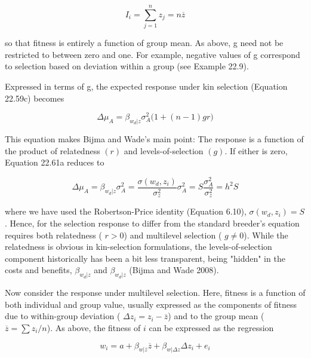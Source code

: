 \documentclass{article}
\begin{document}
\begin{equation}
I_{i}=\sum_{j=1}^{n}z_{j}=n\overline{z}
\end{equation}

so that fitness is entirely a function of group mean. As above, g need not be restricted to between zero and one. For example, negative values of g correspond to selection based on deviation within a group (see Example 22.9).

Expressed in terms of g, the expected response under kin selection (Equation 22.59c) becomes

\begin{equation}
\Delta\mu_{A}=\beta_{w_{d}|z}\sigma_{A}^{2}\bigg(1+(n-1)g r\bigg)
\tag{22.61a}
\label{eq:22_61a}
\end{equation}

This equation makes Bijma and Wade's main point: The response is a function of the product of relatedness  $ (r) $ and levels-of-selection  $ (g) $. If either is zero, Equation 22.61a reduces to

\begin{equation}
\Delta\mu_{A}=\beta_{w_{d}|z}\sigma_{A}^{2}=\frac{\sigma(w_{d},z_{i})}{\sigma_{z}^{2}}\sigma_{A}^{2}=S\frac{\sigma_{A}^{2}}{\sigma_{z}^{2}}=h^{2}S
\tag{22.61b}
\label{eq:22_61b}
\end{equation}

where we have used the Robertson-Price identity (Equation 6.10),  $ \sigma(w_d, z_i) = S $. Hence, for the selection response to differ from the standard breeder's equation requires both relatedness ( $ r > 0 $) and multilevel selection ( $ g \neq 0 $). While the relatedness is obvious in kin-selection formulations, the levels-of-selection component historically has been a bit less transparent, being "hidden" in the costs and benefits,  $ \beta_{w_d | z} $ and  $ \beta_{w_d | z} $ (Bijma and Wade 2008).

Now consider the response under multilevel selection. Here, fitness is a function of both individual and group value, usually expressed as the components of fitness due to within-group deviation ( $ \Delta z_i = z_i - \overline{z} $) and to the group mean ( $ \overline{z} = \sum z_i/n $). As above, the fitness of  $ i $ can be expressed as the regression

\begin{equation}
w_{i}=a+\beta_{w|\overline{{z}}}\overline{{z}}+\beta_{w|\Delta z}\Delta z_{i}+e_{i}
\tag{22.62a}
\label{eq:22_62a}
\end{equation}
\end{document}
